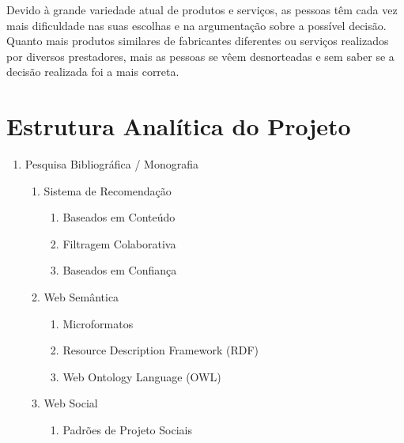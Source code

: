 \documentclass[]{article}
\begin{document}
Devido à grande variedade atual de produtos e serviços, as pessoas têm cada vez mais diﬁculdade nas suas escolhas e na argumentação sobre a possível decisão. Quanto mais produtos similares de fabricantes diferentes ou serviços realizados por diversos prestadores, mais as pessoas se vêem desnorteadas e sem saber se a decisão realizada foi a mais correta.



\section{Estrutura Analítica do Projeto} %
\label{sec:estrutura_analitica_do_projeto}

\begin{enumerate}
		
	\item Pesquisa Bibliográfica / Monografia
	\begin{enumerate}
		\item Sistema de Recomendação
		\begin{enumerate}
			\item Baseados em Conteúdo
			\item Filtragem Colaborativa
			\item Baseados em Confiança
		\end{enumerate}
		\item Web Semântica
		\begin{enumerate}
		  \item Microformatos
			\item Resource Description Framework (RDF)
			\item Web Ontology Language (OWL)
		\end{enumerate}
		\item Web Social
		\begin{enumerate}
		  \item Padrões de Projeto Sociais
		\end{enumerate}
	\end{enumerate}
		

\end{enumerate}
\end{document}
